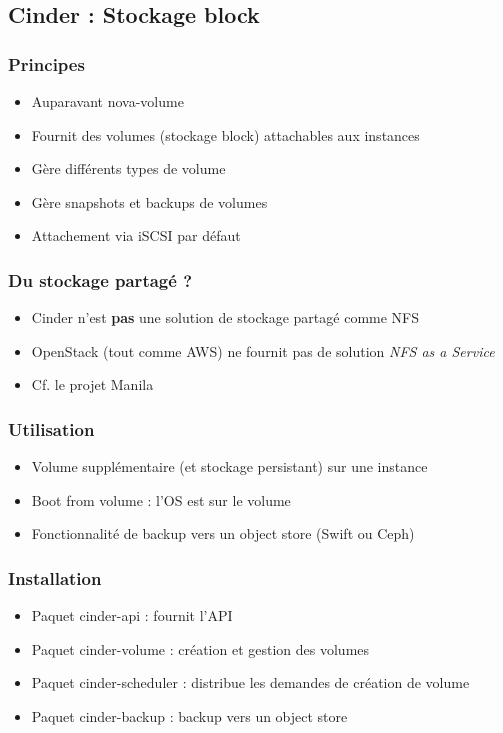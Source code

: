   \subsection[Cinder]{Cinder : Stockage block}

  \begin{frame}
    \frametitle{Principes}
    \begin{itemize}
      \item Auparavant nova-volume
      \item Fournit des volumes (stockage block) attachables aux instances
      \item Gère différents types de volume
      \item Gère snapshots et backups de volumes
      \item Attachement via iSCSI par défaut
    \end{itemize}
  \end{frame}

  \begin{frame}
    \frametitle{Du stockage partagé ?}
    \begin{itemize}
      \item Cinder n'est \textbf{pas} une solution de stockage partagé comme NFS
      \item OpenStack (tout comme AWS) ne fournit pas de solution \textit{NFS as a Service}
      \item Cf. le projet Manila
    \end{itemize}
  \end{frame}

  \begin{frame}
    \frametitle{Utilisation}
    \begin{itemize}
      \item Volume supplémentaire (et stockage persistant) sur une instance
      \item Boot from volume : l'OS est sur le volume
      \item Fonctionnalité de backup vers un object store (Swift ou Ceph)
    \end{itemize}
  \end{frame}

  \begin{frame}
    \frametitle{Installation}
    \begin{itemize}
      \item Paquet cinder-api : fournit l'API
      \item Paquet cinder-volume : création et gestion des volumes
      \item Paquet cinder-scheduler : distribue les demandes de création de volume
      \item Paquet cinder-backup : backup vers un object store
    \end{itemize}
  \end{frame}


